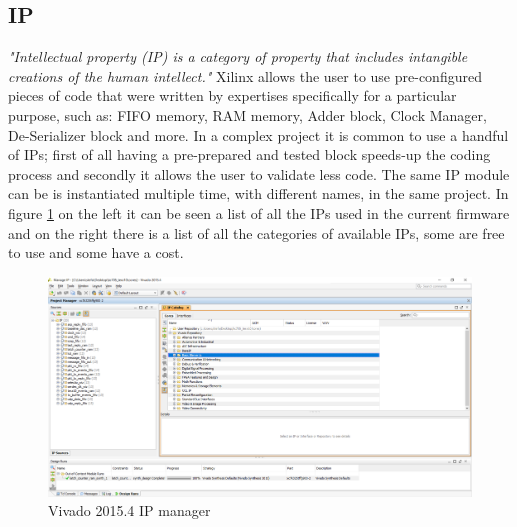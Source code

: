 \subsection{IP}
\noindent \textit{"Intellectual property (IP) is a category of property that includes intangible creations of the human intellect."}
\newline
Xilinx allows the user to use pre-configured pieces of code that were written by expertises specifically for a particular purpose, such as: FIFO memory, RAM memory, Adder block, Clock Manager, De-Serializer block and more.
In a complex project it is common to use a handful of IPs; first of all having a pre-prepared and tested block speeds-up the coding process and secondly it allows the user to validate less code. The same IP module can be is instantiated multiple time, with different names, in the same project. In figure \ref{fig:ip}  on the left it can be seen a list of all the IPs used in the current firmware and on the right there is a list of all the categories of available IPs, some are free to use and some have a cost.
\begin{figure}[H]
	\centering
	\includegraphics[width=0.7\linewidth]{IMG/ch3/IP}
	\caption{Vivado 2015.4 IP manager}
	\label{fig:ip}
\end{figure} 

